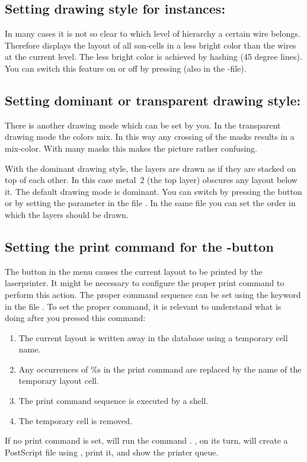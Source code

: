 \subsection{Setting drawing style for instances: \protect{}}
\label{hashed}
In many cases it is not so clear to which level of hierarchy a certain
wire belongs. Therefore  displays the layout of all
son-cells in a less bright color than the wires at the current level.
The less bright color is achieved by hashing (45 degree lines). You can
switch this feature on or off by pressing  (also in the
-file). 

\subsection{Setting dominant or transparent drawing style:
\protect{}}
There is another drawing mode which can be set by you.  In the
transparent drawing mode the colors mix. In this way any crossing of
the masks results in a mix-color.  With many masks this makes the
picture rather confusing.

With the dominant drawing style, the layers are drawn as if they are
stacked on top of each other. In this case metal~2 (the top layer)
obscures any layout below it.  The default drawing mode is dominant.
You can switch by pressing the button  or by setting
the parameter in the file . In the same file you can set the
order in which the layers should be drawn.

\subsection{Setting the print command for the \protect{}-button}
 \label{hardcopy}
The button  in the  menu
causes the current layout to be printed by the laserprinter. 
It might be necessary to configure the proper print command to
perform this action. The proper command sequence can be 
set using the keyword  in the file . 
To set the proper command, it is relevant to understand what 
is doing after you pressed this command: 
\begin{enumerate}
\item
The current layout is written away in the  database 
using a temporary cell name.
\item
Any occurrences of \%s in the print command are 
replaced by the name of the temporary layout cell.
\item
The print command sequence is executed by a shell. 
\item
The temporary cell is removed.
\end{enumerate}
If no print command is set,  will run the command .
, on its turn, will create a PostScript file using ,
print it, and show the printer queue.

